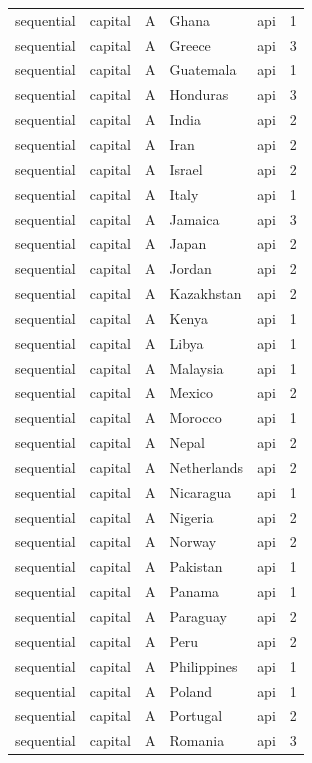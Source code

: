\begin{tabular}{lllllr}
sequential & capital & A & Ghana & api & 1 \\
sequential & capital & A & Greece & api & 3 \\
sequential & capital & A & Guatemala & api & 1 \\
sequential & capital & A & Honduras & api & 3 \\
sequential & capital & A & India & api & 2 \\
sequential & capital & A & Iran & api & 2 \\
sequential & capital & A & Israel & api & 2 \\
sequential & capital & A & Italy & api & 1 \\
sequential & capital & A & Jamaica & api & 3 \\
sequential & capital & A & Japan & api & 2 \\
sequential & capital & A & Jordan & api & 2 \\
sequential & capital & A & Kazakhstan & api & 2 \\
sequential & capital & A & Kenya & api & 1 \\
sequential & capital & A & Libya & api & 1 \\
sequential & capital & A & Malaysia & api & 1 \\
sequential & capital & A & Mexico & api & 2 \\
sequential & capital & A & Morocco & api & 1 \\
sequential & capital & A & Nepal & api & 2 \\
sequential & capital & A & Netherlands & api & 2 \\
sequential & capital & A & Nicaragua & api & 1 \\
sequential & capital & A & Nigeria & api & 2 \\
sequential & capital & A & Norway & api & 2 \\
sequential & capital & A & Pakistan & api & 1 \\
sequential & capital & A & Panama & api & 1 \\
sequential & capital & A & Paraguay & api & 2 \\
sequential & capital & A & Peru & api & 2 \\
sequential & capital & A & Philippines & api & 1 \\
sequential & capital & A & Poland & api & 1 \\
sequential & capital & A & Portugal & api & 2 \\
sequential & capital & A & Romania & api & 3 \\

\end{tabular}
